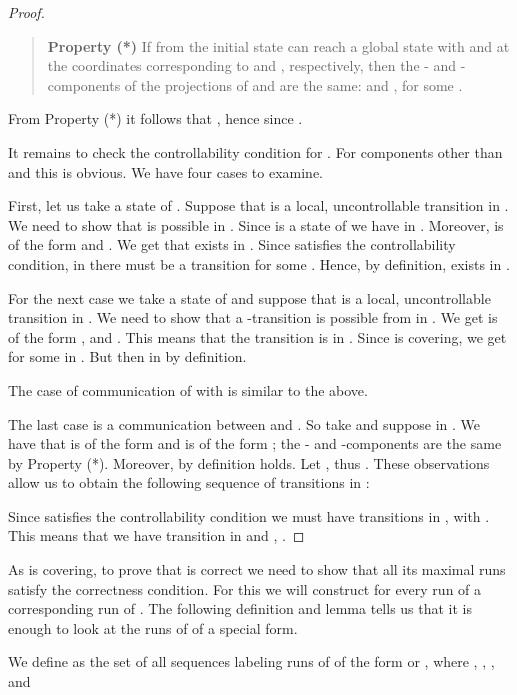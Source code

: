 \documentclass[10pt,a4paper]{article}
\newcommand{\anca}[1]{}
\begin{document}
\begin{proof}
  \begin{quote}
    \textbf{Property (*)} If from the initial state  can reach a
  global state with  and  at the coordinates
  corresponding to  and , respectively, then the - and -components of the  projections of  and  are the same:
  and
  , for some .

  \end{quote}
  

  From Property (*) it follows that , hence
   since .

  It remains to check the controllability condition for . For
  components other than  and  this is obvious. 
  We have four cases to examine.

  First, let us take a state  of . Suppose that
   is a local, uncontrollable transition in
  . We need to show that  is possible
  in . Since  is a state of  we have
   in . Moreover,  is of the
  form  and . We get that
   \anca{changed 2nd f in f'}exists in .  Since
   satisfies the controllability condition, in  there must
  be a transition  for some . Hence, by
  definition,  exists in .

  For the next case we take a state  of  and suppose that
   is a local, uncontrollable transition in
  . We need to show that a -transition is possible from
   in . We get  is of the form , and
  . This means that the transition
   is in . Since
   is covering, we get  for some  in
  . But then  in  by
  definition.

  The case of communication of  with  is similar to the
  above.

  The last case is a communication between  and . So take
   and suppose
   in . We have that
   is of the form  and
   is of the form ; the - and
  -components are the same by Property (*). Moreover,
  by definition  holds. Let , thus
  . These observations allow us to
  obtain the following sequence of transitions in :
  \anca{changed 2nd f in f'}
  
  Since  satisfies the controllability condition   we must
  have transitions  in , 
  with . This means that we have transition
   in  and 
  , . 
\end{proof}

As  is covering, to prove that  is correct we need to show
that all its maximal runs satisfy the correctness condition. For this
we will construct for every run of  a corresponding run of . The following definition and lemma tells us that it is enough to
look at the runs of  of a special form. 
\begin{definition}[]\label{def:slow}
  We define  as the set of all 
  sequences labeling runs of  of the form  or , 
where , ,  , and 
\end{definition}
\end{document}
